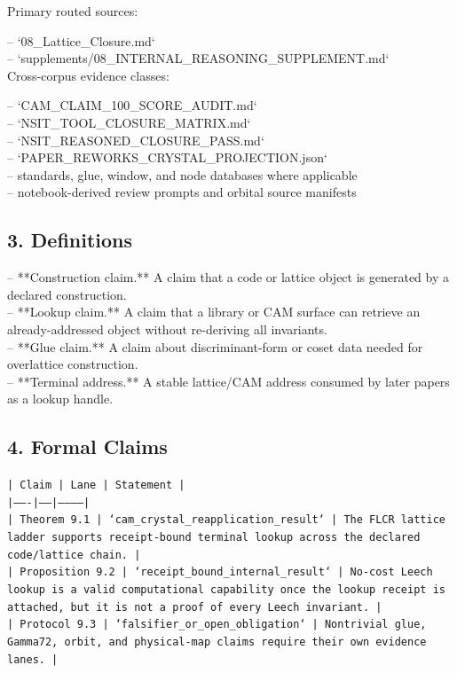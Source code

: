 \documentclass[11pt]{article}
\begin{document}
Primary routed sources:

\noindent{}-- `08\_Lattice\_Closure.md`\\
\noindent{}-- `supplements/08\_INTERNAL\_REASONING\_SUPPLEMENT.md`\\

Cross-corpus evidence classes:

\noindent{}-- `CAM\_CLAIM\_100\_SCORE\_AUDIT.md`\\
\noindent{}-- `NSIT\_TOOL\_CLOSURE\_MATRIX.md`\\
\noindent{}-- `NSIT\_REASONED\_CLOSURE\_PASS.md`\\
\noindent{}-- `PAPER\_REWORKS\_CRYSTAL\_PROJECTION.json`\\
\noindent{}-- standards, glue, window, and node databases where applicable\\
\noindent{}-- notebook-derived review prompts and orbital source manifests\\

\subsection*{3. Definitions}

\noindent{}-- **Construction claim.** A claim that a code or lattice object is generated by a declared construction.\\
\noindent{}-- **Lookup claim.** A claim that a library or CAM surface can retrieve an already-addressed object without re-deriving all invariants.\\
\noindent{}-- **Glue claim.** A claim about discriminant-form or coset data needed for overlattice construction.\\
\noindent{}-- **Terminal address.** A stable lattice/CAM address consumed by later papers as a lookup handle.\\

\subsection*{4. Formal Claims}

\noindent\texttt{| Claim | Lane | Statement |}\\
\noindent\texttt{|-------|------|-----------|}\\
\noindent\texttt{| Theorem 9.1 | `cam\_crystal\_reapplication\_result` | The FLCR lattice ladder supports receipt-bound terminal lookup across the declared code/lattice chain. |}\\
\noindent\texttt{| Proposition 9.2 | `receipt\_bound\_internal\_result` | No-cost Leech lookup is a valid computational capability once the lookup receipt is attached, but it is not a proof of every Leech invariant. |}\\
\noindent\texttt{| Protocol 9.3 | `falsifier\_or\_open\_obligation` | Nontrivial glue, Gamma72, orbit, and physical-map claims require their own evidence lanes. |}\\
\end{document}
